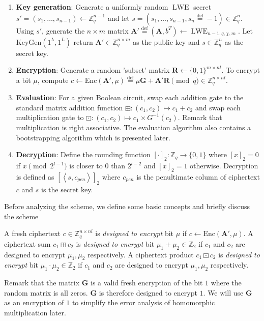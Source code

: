 \begin{enumerate}
    \item \textbf{Key generation}: Generate a uniformly random $\operatorname{LWE}$ secret $s' = (s_1, \dots, s_{n-1}) \leftarrow \mathbb{Z}_q^{n-1}$ and let $s = (s_1, \dots, s_{n-1}, s_n \stackrel{\mathrm{def}}{=} -1) \in \mathbb{Z}_q^{n}$. Using $s'$, generate the $n \times m$ matrix $\mathbf{A}' \stackrel{\mathrm{def}}{=} (\mathbf{A}, b^T) \leftarrow \operatorname{LWE}_{n-1,q,\chi,m}$. Let $\text{KeyGen}(1^\lambda, 1^L)$ return $\mathbf{A}' \in \mathbb{Z}_q^{n \times m}$ as the public key and $s \in \mathbb{Z}_q^n$ as the secret key. 
    \item \textbf{Encryption}: Generate a random 'subset' matrix $\mathbf{R} \leftarrow \{0,1\}^{m \times nl}$. To encrypt a bit $\mu$, compute $c \leftarrow \text{Enc}(\mathbf{A}',\mu) \stackrel{\mathrm{def}}{=} \mu \mathbf{G} + \mathbf{A}'\mathbf{R} \pmod q \in \mathbb{Z}_q^{n\times nl}$.
    \item \textbf{Evaluation}: For a given Boolean circuit, swap each addition gate to the standard matrix addition function $\boxplus \colon (c_1,c_2) \mapsto c_1 + c_2$ and swap each multiplication gate to $\boxdot \colon (c_1, c_2) \mapsto c_1 \times G^{-1}(c_2)$. Remark that multiplication is right associative. The evaluation algorithm also contains a bootstrapping algorithm which is presented later.
    \item \textbf{Decryption}: Define the rounding function $[\cdot]_2 \colon \mathbb{Z}_q \to \{0,1\}$ where $[x]_2 = 0$ if $x \pmod {2^{l-1}}$ is closer to $0$ than $2^{l-2}$ and $[x]_2 = 1$ otherwise. Decryption is defined as $[\left \langle s,c_{pen} \right \rangle]_2$ where $c_{pen}$ is the penultimate column of ciphertext $c$ and $s$ is the secret key. 
\end{enumerate}

Before analyzing the scheme, we define some basic concepts and briefly discuss the scheme
\begin{definition}
    A fresh ciphertext $c \in \mathbb{Z}_q^{n \times nl}$ is \textit{designed to encrypt} bit $\mu$ if $c \leftarrow \text{Enc}(\mathbf{A}',\mu)$. A ciphertext sum $c_1 \boxplus c_2$ is \textit{designed to encrypt} bit $\mu_1 + \mu_2 \in \mathbb{Z}_2$ if $c_1$ and $c_2$ are designed to encrypt $\mu_1, \mu_2$ respectively. A ciphertext product $c_1 \boxdot c_2$ is \textit{designed to encrypt} bit $\mu_1 \cdot \mu_2 \in \mathbb{Z}_2$ if $c_1$ and $c_2$ are designed to encrypt $\mu_1, \mu_2$ respectively.
\end{definition}
Remark that the matrix $\mathbf{G}$ is a valid fresh encryption of the bit $1$ where the random matrix is all zeros. $\mathbf{G}$ is therefore designed to encrypt $1$. We will use $\mathbf{G}$ as an encryption of $1$ to simplify the error analysis of homomorphic multiplication later. 

